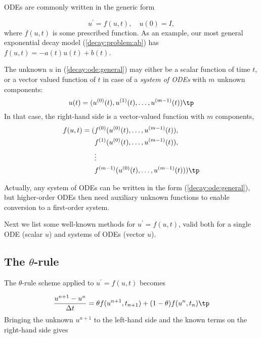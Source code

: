 \documentclass[graybox,sectrefs,envcountresetchap,open=right,final]{svmonodo}
\begin{document}
ODEs are commonly written in the generic form

\begin{equation}
u^{\prime} = f(u,t),\quad u(0)=I,
\label{decay:ode:general}
\end{equation}
where $f(u,t)$  is some prescribed function.
As an example, our most
general exponential decay model (\ref{decay:problem:ab}) has
$f(u,t)=-a(t)u(t) + b(t)$.

The unknown $u$ in (\ref{decay:ode:general}) may either be
a scalar function of time $t$, or a vector valued function of $t$ in
case of a \emph{system of ODEs} with $m$ unknown components:
\[ u(t) = (u^{(0)}(t),u^{(1)}(t),\ldots,u^{(m-1)}(t)) \tp  \]
In that case, the right-hand side is a vector-valued function with $m$
components,
\begin{align*}
f(u, t) = ( & f^{(0)}(u^{(0)}(t),\ldots,u^{(m-1)}(t)),\\ 
            & f^{(1)}(u^{(0)}(t),\ldots,u^{(m-1)}(t)),\\ 
            & \vdots\\ 
            & f^{(m-1)}(u^{(0)}(t),\ldots,u^{(m-1)}(t)))
\tp
\end{align*}

Actually, any system of ODEs can
be written in the form (\ref{decay:ode:general}), but higher-order
ODEs then need auxiliary unknown functions to enable conversion to
a first-order system.


Next we list some well-known methods for $u^{\prime}=f(u,t)$, valid both for
a single ODE (scalar $u$) and systems of ODEs (vector $u$).


\subsection{The $\theta$-rule}

The $\theta$-rule scheme applied to $u^{\prime}=f(u,t)$ becomes

\begin{equation}
\frac{u^{n+1}-u^n}{\Delta t} = \theta f(u^{n+1},t_{n+1}) +
(1-\theta)f(u^n, t_n)\tp
\label{decay:fd2:theta}
\end{equation}
Bringing the unknown $u^{n+1}$ to the left-hand side and the known terms
on the right-hand side gives

   
\end{document}
